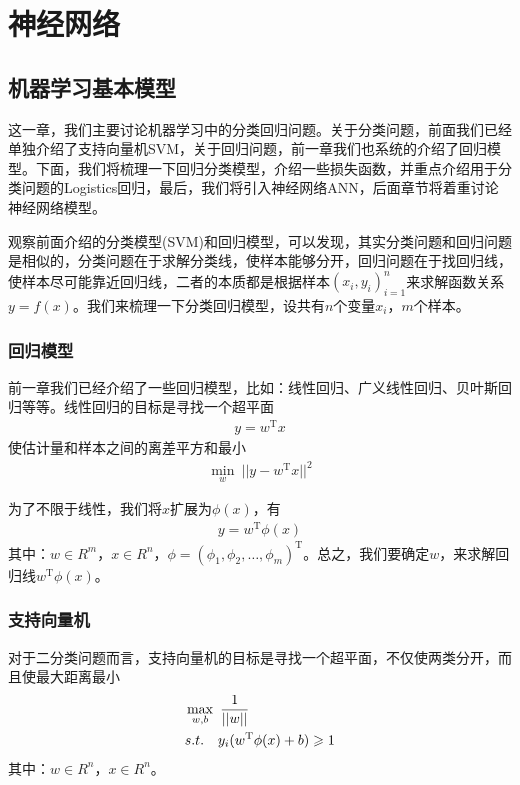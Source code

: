 
\chapter{神经网络}
\section{机器学习基本模型}
    \par
    这一章，我们主要讨论机器学习中的分类回归问题。关于分类问题，前面我们已经单独介绍了支持向量机SVM，关于回归问题，前一章我们也系统的介绍了回归模型。下面，我们将梳理一下回归分类模型，介绍一些损失函数，并重点介绍用于分类问题的Logistics回归，最后，我们将引入神经网络ANN，后面章节将着重讨论神经网络模型。
    \par
    观察前面介绍的分类模型(SVM)和回归模型，可以发现，其实分类问题和回归问题是相似的，分类问题在于求解分类线，使样本能够分开，回归问题在于找回归线，使样本尽可能靠近回归线，二者的本质都是根据样本$(x_i,y_i)_{i=1}^n$来求解函数关系$y = f(x)$。我们来梳理一下分类回归模型，设共有$n$个变量$x_i$，$m$个样本。
    \subsection{回归模型}
        \par
        前一章我们已经介绍了一些回归模型，比如：线性回归、广义线性回归、贝叶斯回归等等。线性回归的目标是寻找一个超平面
        \begin{align*}
        y = w^\mathrm{T}x
        \end{align*}
        使估计量和样本之间的离差平方和最小
        \begin{align}
        \label{线性回归的最小二乘目标}
        \min_w \ ||y - w^\mathrm{T}x||^2
        \end{align}
        \par
        为了不限于线性，我们将$x$扩展为$\phi(x)$，有
        \begin{align*}
        y = w^\mathrm{T}\phi(x)
        \end{align*}
        其中：$w\in R^{m}$，$x\in R^n$，$\phi = (\phi_1,\phi_2,\dots,\phi_m)^\mathrm{T}$。总之，我们要确定$w$，来求解回归线$w^\mathrm{T}\phi(x)$。
    \subsection{支持向量机}
        \par
        对于二分类问题而言，支持向量机的目标是寻找一个超平面，不仅使两类分开，而且使最大距离最小
        \begin{align}
        \label{二分类支持向量机的优化目标}
        &\max_{w,b} \ \frac{1}{||w||}\\
        &s.t. \quad y_i(w^\mathrm{T}\phi(x)+b) \geqslant 1 \notag
        \end{align}
        其中：$w\in R^n$，$x\in R^n$。
